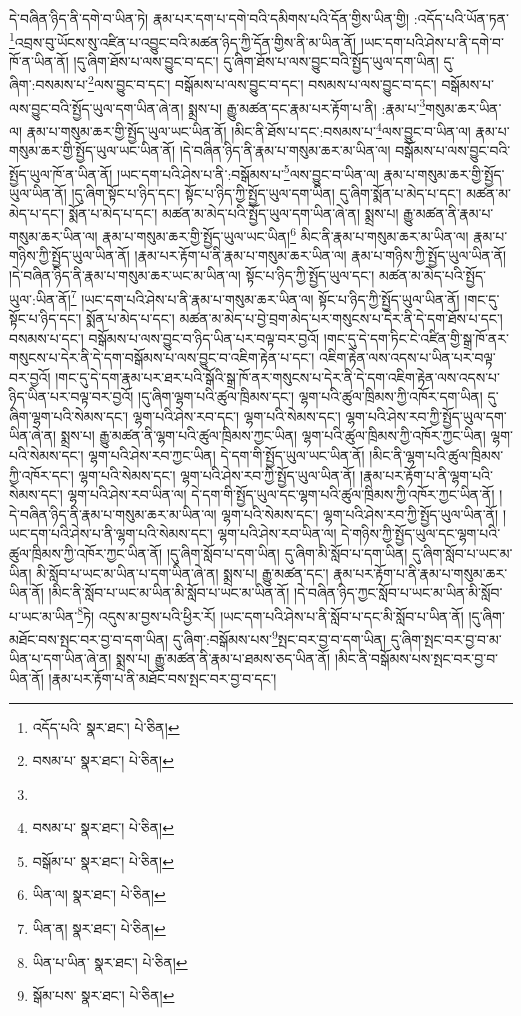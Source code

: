 དེ་བཞིན་ཉིད་ནི་དགེ་བ་ཡིན་ཏེ། རྣམ་པར་དག་པ་དགེ་བའི་དམིགས་པའི་དོན་གྱིས་ཡིན་གྱི། :འདོད་པའི་ཡོན་ཏན་\footnote{འདོད་པའི་  སྣར་ཐང་།  པེ་ཅིན། }འབྲས་བུ་ཡོངས་སུ་འཛིན་པ་འབྱུང་བའི་མཚན་ཉིད་ཀྱི་དོན་གྱིས་ནི་མ་ཡིན་ནོ། །ཡང་དག་པའི་ཤེས་པ་ནི་དགེ་བ་ཁོ་ན་ཡིན་ནོ། །དུ་ཞིག་ཐོས་པ་ལས་བྱུང་བ་དང་། དུ་ཞིག་ཐོས་པ་ལས་བྱུང་བའི་སྤྱོད་ཡུལ་དག་ཡིན། དུ་ཞིག་:བསམས་པ་\footnote{བསམ་པ་  སྣར་ཐང་།  པེ་ཅིན། }ལས་བྱུང་བ་དང་། བསྒོམས་པ་ལས་བྱུང་བ་དང་། བསམས་པ་ལས་བྱུང་བ་དང་། བསྒོམས་པ་ལས་བྱུང་བའི་སྤྱོད་ཡུལ་དག་ཡིན་ཞེ་ན། སྨྲས་པ། རྒྱུ་མཚན་དང་རྣམ་པར་རྟོག་པ་ནི། :རྣམ་པ་\footnote{}གསུམ་ཆར་ཡིན་ལ། རྣམ་པ་གསུམ་ཆར་གྱི་སྤྱོད་ཡུལ་ཡང་ཡིན་ནོ། །མིང་ནི་ཐོས་པ་དང་:བསམས་པ་\footnote{བསམ་པ་  སྣར་ཐང་།  པེ་ཅིན། }ལས་བྱུང་བ་ཡིན་ལ། རྣམ་པ་གསུམ་ཆར་གྱི་སྤྱོད་ཡུལ་ཡང་ཡིན་ནོ། །དེ་བཞིན་ཉིད་ནི་རྣམ་པ་གསུམ་ཆར་མ་ཡིན་ལ། བསྒོམས་པ་ལས་བྱུང་བའི་སྤྱོད་ཡུལ་ཁོ་ན་ཡིན་ནོ། །ཡང་དག་པའི་ཤེས་པ་ནི་:བསྒོམས་པ་\footnote{བསྒོམ་པ་  སྣར་ཐང་།  པེ་ཅིན། }ལས་བྱུང་བ་ཡིན་ལ། རྣམ་པ་གསུམ་ཆར་གྱི་སྤྱོད་ཡུལ་ཡིན་ནོ། །དུ་ཞིག་སྟོང་པ་ཉིད་དང་། སྟོང་པ་ཉིད་ཀྱི་སྤྱོད་ཡུལ་དག་ཡིན། དུ་ཞིག་སྨོན་པ་མེད་པ་དང་། མཚན་མ་མེད་པ་དང་། སྨོན་པ་མེད་པ་དང་། མཚན་མ་མེད་པའི་སྤྱོད་ཡུལ་དག་ཡིན་ཞེ་ན། སྨྲས་པ། རྒྱུ་མཚན་ནི་རྣམ་པ་གསུམ་ཆར་ཡིན་ལ། རྣམ་པ་གསུམ་ཆར་གྱི་སྤྱོད་ཡུལ་ཡང་ཡིན།\footnote{ཡིན་ལ།  སྣར་ཐང་།  པེ་ཅིན། } མིང་ནི་རྣམ་པ་གསུམ་ཆར་མ་ཡིན་ལ། རྣམ་པ་གཉིས་ཀྱི་སྤྱོད་ཡུལ་ཡིན་ནོ། །རྣམ་པར་རྟོག་པ་ནི་རྣམ་པ་གསུམ་ཆར་ཡིན་ལ། རྣམ་པ་གཉིས་ཀྱི་སྤྱོད་ཡུལ་ཡིན་ནོ། །དེ་བཞིན་ཉིད་ནི་རྣམ་པ་གསུམ་ཆར་ཡང་མ་ཡིན་ལ། སྟོང་པ་ཉིད་ཀྱི་སྤྱོད་ཡུལ་དང་། མཚན་མ་མེད་པའི་སྤྱོད་ཡུལ་:ཡིན་ནོ།\footnote{ཡིན་ན།  སྣར་ཐང་།  པེ་ཅིན། } །ཡང་དག་པའི་ཤེས་པ་ནི་རྣམ་པ་གསུམ་ཆར་ཡིན་ལ། སྟོང་པ་ཉིད་ཀྱི་སྤྱོད་ཡུལ་ཡིན་ནོ། །གང་དུ་སྟོང་པ་ཉིད་དང་། སྨོན་པ་མེད་པ་དང་། མཚན་མ་མེད་པ་བྱེ་བྲག་མེད་པར་གསུངས་པ་དེར་ནི་དེ་དག་ཐོས་པ་དང་། བསམས་པ་དང་། བསྒོམས་པ་ལས་བྱུང་བ་ཉིད་ཡིན་པར་བལྟ་བར་བྱའོ། །གང་དུ་དེ་དག་ཏིང་ངེ་འཛིན་གྱི་སྒྲ་ཁོ་ནར་གསུངས་པ་དེར་ནི་དེ་དག་བསྒོམས་པ་ལས་བྱུང་བ་འཇིག་རྟེན་པ་དང་། འཇིག་རྟེན་ལས་འདས་པ་ཡིན་པར་བལྟ་བར་བྱའོ། །གང་དུ་དེ་དག་རྣམ་པར་ཐར་པའི་སྒོའི་སྒྲ་ཁོ་ནར་གསུངས་པ་དེར་ནི་དེ་དག་འཇིག་རྟེན་ལས་འདས་པ་ཉིད་ཡིན་པར་བལྟ་བར་བྱའོ། །དུ་ཞིག་ལྷག་པའི་ཚུལ་ཁྲིམས་དང་། ལྷག་པའི་ཚུལ་ཁྲིམས་ཀྱི་འཁོར་དག་ཡིན། དུ་ཞིག་ལྷག་པའི་སེམས་དང་། ལྷག་པའི་ཤེས་རབ་དང་། ལྷག་པའི་སེམས་དང་། ལྷག་པའི་ཤེས་རབ་ཀྱི་སྤྱོད་ཡུལ་དག་ཡིན་ཞེ་ན། སྨྲས་པ། རྒྱུ་མཚན་ནི་ལྷག་པའི་ཚུལ་ཁྲིམས་ཀྱང་ཡིན། ལྷག་པའི་ཚུལ་ཁྲིམས་ཀྱི་འཁོར་ཀྱང་ཡིན། ལྷག་པའི་སེམས་དང་། ལྷག་པའི་ཤེས་རབ་ཀྱང་ཡིན། དེ་དག་གི་སྤྱོད་ཡུལ་ཡང་ཡིན་ནོ། །མིང་ནི་ལྷག་པའི་ཚུལ་ཁྲིམས་ཀྱི་འཁོར་དང་། ལྷག་པའི་སེམས་དང་། ལྷག་པའི་ཤེས་རབ་ཀྱི་སྤྱོད་ཡུལ་ཡིན་ནོ། །རྣམ་པར་རྟོག་པ་ནི་ལྷག་པའི་སེམས་དང་། ལྷག་པའི་ཤེས་རབ་ཡིན་ལ། དེ་དག་གི་སྤྱོད་ཡུལ་དང་ལྷག་པའི་ཚུལ་ཁྲིམས་ཀྱི་འཁོར་ཀྱང་ཡིན་ནོ། །དེ་བཞིན་ཉིད་ནི་རྣམ་པ་གསུམ་ཆར་མ་ཡིན་ལ། ལྷག་པའི་སེམས་དང་། ལྷག་པའི་ཤེས་རབ་ཀྱི་སྤྱོད་ཡུལ་ཡིན་ནོ། །ཡང་དག་པའི་ཤེས་པ་ནི་ལྷག་པའི་སེམས་དང་། ལྷག་པའི་ཤེས་རབ་ཡིན་ལ། དེ་གཉིས་ཀྱི་སྤྱོད་ཡུལ་དང་ལྷག་པའི་ཚུལ་ཁྲིམས་ཀྱི་འཁོར་ཀྱང་ཡིན་ནོ། །དུ་ཞིག་སློབ་པ་དག་ཡིན། དུ་ཞིག་མི་སློབ་པ་དག་ཡིན། དུ་ཞིག་སློབ་པ་ཡང་མ་ཡིན། མི་སློབ་པ་ཡང་མ་ཡིན་པ་དག་ཡིན་ཞེ་ན། སྨྲས་པ། རྒྱུ་མཚན་དང་། རྣམ་པར་རྟོག་པ་ནི་རྣམ་པ་གསུམ་ཆར་ཡིན་ནོ། །མིང་ནི་སློབ་པ་ཡང་མ་ཡིན་མི་སློབ་པ་ཡང་མ་ཡིན་ནོ། །དེ་བཞིན་ཉིད་ཀྱང་སློབ་པ་ཡང་མ་ཡིན་མི་སློབ་པ་ཡང་མ་ཡིན་\footnote{ཡིན་པ་ཡིན་  སྣར་ཐང་།  པེ་ཅིན། }ཏེ། འདུས་མ་བྱས་པའི་ཕྱིར་རོ། །ཡང་དག་པའི་ཤེས་པ་ནི་སློབ་པ་དང་མི་སློབ་པ་ཡིན་ནོ། །དུ་ཞིག་མཐོང་བས་སྤང་བར་བྱ་བ་དག་ཡིན། དུ་ཞིག་:བསྒོམས་པས་\footnote{སྒོམ་པས་  སྣར་ཐང་།  པེ་ཅིན། }སྤང་བར་བྱ་བ་དག་ཡིན། དུ་ཞིག་སྤང་བར་བྱ་བ་མ་ཡིན་པ་དག་ཡིན་ཞེ་ན། སྨྲས་པ། རྒྱུ་མཚན་ནི་རྣམ་པ་ཐམས་ཅད་ཡིན་ནོ། །མིང་ནི་བསྒོམས་པས་སྤང་བར་བྱ་བ་ཡིན་ནོ། །རྣམ་པར་རྟོག་པ་ནི་མཐོང་བས་སྤང་བར་བྱ་བ་དང་། 